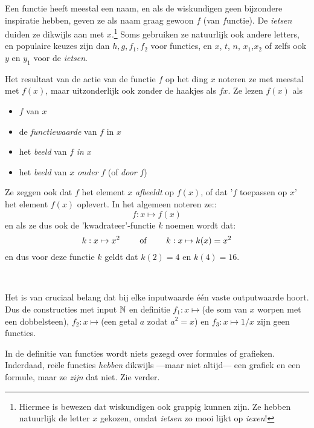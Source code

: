 \documentclass{ximera}
\begin{document}
Een functie heeft meestal een naam, en als de wiskundigen geen bijzondere inspiratie hebben, geven ze als naam graag gewoon $f$ (van $f$unctie). De \textit{ietsen} duiden ze dikwijls aan met $x$.\footnote{Hiermee is bewezen dat wiskundigen ook grappig kunnen zijn. Ze hebben natuurlijk de letter $x$ gekozen, omdat \textit{ietsen} zo mooi lijkt op \textit{iexen}!} Soms gebruiken ze natuurlijk ook andere letters, en populaire keuzes zijn dan $h,g,f_1, f_2$ voor functies, en $x$, $t$, $n$, $x_1$,$x_2$ of zelfs ook $y$ en $y_1$  voor de \textit{ietsen}. 

Het resultaat van de actie van de functie $f$ op het ding $x$ noteren ze met meestal met $f(x)$, maar uitzonderlijk ook zonder de haakjes als $fx$. Ze lezen $f(x)$ als 
\begin{itemize}
\item $f$ van $x$
\item de \textit{functiewaarde} van $f$ in $x$
\item het \textit{beeld} van $f$ \textit{in} $x$
\item het \textit{beeld} van $x$ \textit{onder} $f$ (of \textit{door} $f$)
\end{itemize}
Ze zeggen ook dat $f$ het element $x$ \textit{afbeeldt} op $f(x)$, of dat '$f$ toepassen op $x$' het element $f(x)$ oplevert. In het algemeen noteren ze::
$$
f: x \mapsto f(x) 
$$
en als ze dus ook de 'kwadrateer'-functie $k$ noemen wordt dat:
$$
k: x \mapsto x^2 \text{ \qquad of \qquad }  k: x \mapsto k(x) = x^2
$$
en dus voor deze functie $k$ geldt dat $k(2)=4$ en $k(4)=16$.

\begin{center}
\end{center}

\begin{remark} \ 
    
 Het is van cruciaal belang dat bij elke inputwaarde één vaste outputwaarde hoort. Dus de constructies met input $\mathbb{N}$ en definitie $f_1: x\mapsto $(de som van $x$ worpen met een dobbelsteen), $f_2: x\mapsto $(een getal $a$ zodat $a^2=x$) en $f_3:x\mapsto 1/x$ zijn geen functies.
 
 In de definitie van functies wordt niets gezegd over formules of grafieken. Inderdaad, reële functies \textit{hebben} dikwijls ---maar niet altijd--- een grafiek en een formule, maar ze \textit{zijn} dat niet. Zie verder.
\end{remark}
 
\end{document}
